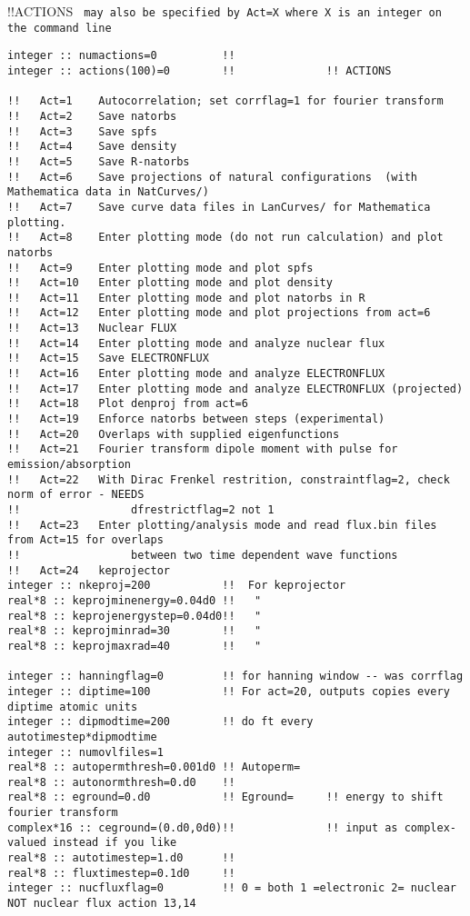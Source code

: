 !!{\large \quad ACTIONS} \verb# may also be specified by Act=X where X is an integer on the command line #
\begin{verbatim}
integer :: numactions=0          !! 
integer :: actions(100)=0        !!              !! ACTIONS

!!   Act=1    Autocorrelation; set corrflag=1 for fourier transform
!!   Act=2    Save natorbs
!!   Act=3    Save spfs
!!   Act=4    Save density
!!   Act=5    Save R-natorbs
!!   Act=6    Save projections of natural configurations  (with Mathematica data in NatCurves/)
!!   Act=7    Save curve data files in LanCurves/ for Mathematica plotting.
!!   Act=8    Enter plotting mode (do not run calculation) and plot natorbs 
!!   Act=9    Enter plotting mode and plot spfs
!!   Act=10   Enter plotting mode and plot density
!!   Act=11   Enter plotting mode and plot natorbs in R
!!   Act=12   Enter plotting mode and plot projections from act=6
!!   Act=13   Nuclear FLUX 
!!   Act=14   Enter plotting mode and analyze nuclear flux
!!   Act=15   Save ELECTRONFLUX
!!   Act=16   Enter plotting mode and analyze ELECTRONFLUX 
!!   Act=17   Enter plotting mode and analyze ELECTRONFLUX (projected)
!!   Act=18   Plot denproj from act=6
!!   Act=19   Enforce natorbs between steps (experimental)
!!   Act=20   Overlaps with supplied eigenfunctions
!!   Act=21   Fourier transform dipole moment with pulse for emission/absorption
!!   Act=22   With Dirac Frenkel restrition, constraintflag=2, check norm of error - NEEDS
!!                 dfrestrictflag=2 not 1
!!   Act=23   Enter plotting/analysis mode and read flux.bin files from Act=15 for overlaps
!!                 between two time dependent wave functions
!!   Act=24   keprojector
integer :: nkeproj=200           !!  For keprojector
real*8 :: keprojminenergy=0.04d0 !!   "
real*8 :: keprojenergystep=0.04d0!!   "
real*8 :: keprojminrad=30        !!   "
real*8 :: keprojmaxrad=40        !!   "

integer :: hanningflag=0         !! for hanning window -- was corrflag
integer :: diptime=100           !! For act=20, outputs copies every diptime atomic units
integer :: dipmodtime=200        !! do ft every autotimestep*dipmodtime
integer :: numovlfiles=1
real*8 :: autopermthresh=0.001d0 !! Autoperm=
real*8 :: autonormthresh=0.d0    !! 
real*8 :: eground=0.d0           !! Eground=     !! energy to shift fourier transform 
complex*16 :: ceground=(0.d0,0d0)!!              !! input as complex-valued instead if you like
real*8 :: autotimestep=1.d0      !!
real*8 :: fluxtimestep=0.1d0     !!
integer :: nucfluxflag=0         !! 0 = both 1 =electronic 2= nuclear  NOT nuclear flux action 13,14
\end{verbatim}
